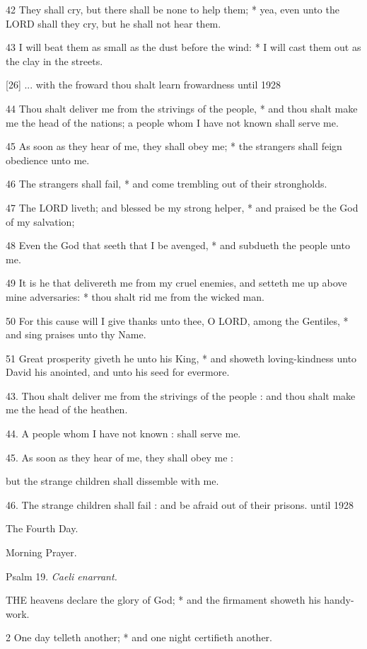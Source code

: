 42 They shall cry, but there shall be none to help
them; * yea, even unto the LORD shall they cry,
but he shall not hear them.

43 I will beat them as small as the dust before the
wind: * I will cast them out as the clay in the streets.

[26] ... with the froward
thou shalt learn frowardness until
1928

44 Thou shalt deliver me from the strivings of the people,
* and thou shalt make me the head of the nations; a people whom I have not
known shall serve me.

45 As soon as they hear of me, they shall obey me; *
the strangers shall feign obedience unto me.

46 The strangers shall fail, * and come trembling out
of their strongholds.

47 The LORD liveth; and blessed
be my strong helper, * and praised be the God of my salvation;

48 Even the God that seeth that I be avenged, * and subdueth
the people unto me.

49 It is he that delivereth me from my cruel enemies,
and setteth me up above mine adversaries: * thou shalt rid me from the wicked
man.

50 For this cause will I give thanks unto thee, O LORD,
among the Gentiles, * and sing praises unto thy Name.

51 Great prosperity giveth he unto his King, * and showeth
loving-kindness unto David his anointed, and unto his seed for evermore.

43. Thou shalt deliver me
from the strivings of the people : and thou shalt make me the head of the
heathen.

44. A people whom I have not known : shall serve me.

45. As soon as they hear of me, they shall obey me : 

but the strange children shall dissemble with me.

46. The strange children shall fail : and be afraid out of their prisons.
until
1928

The
Fourth Day.

Morning Prayer.

Psalm
19. \emph{Caeli enarrant.}

THE
heavens declare the glory of God; * and the firmament showeth his handy-work.

2 One day telleth another; * and one night certifieth
another.

